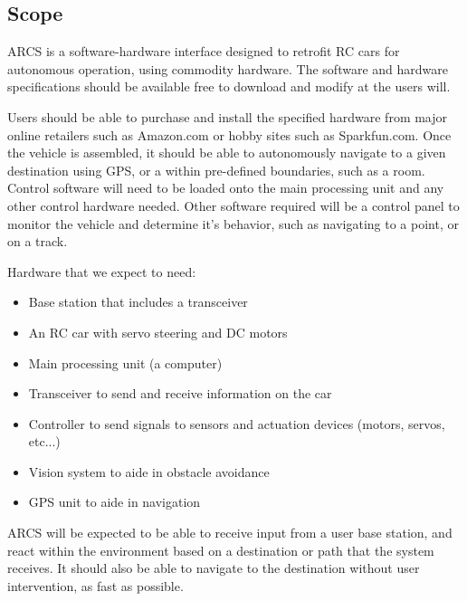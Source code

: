 \documentclass[compsoc,draftclsnofoot,onecolumn,10pt]{IEEEtran}
\begin{document}
\subsection{Scope} %
ARCS is a software-hardware interface designed to retrofit RC cars for autonomous operation, using commodity hardware. 
The software and hardware specifications should be available free to download and modify at the users will. \par
Users should be able to purchase and install the specified hardware from major online retailers such as Amazon.com or hobby sites such as Sparkfun.com.
Once the vehicle is assembled, it should be able to autonomously navigate to a given destination using GPS, or a within pre-defined boundaries, such as a room.  
Control software will need to be loaded onto the main processing unit and any other control hardware needed. 
Other software required will be a control panel to monitor the vehicle and determine it's behavior, such as navigating to a point, or on a track. 

Hardware that we expect to need:
\begin{itemize} 
\item Base station that includes a transceiver
\item An RC car with servo steering and DC motors
\item Main processing unit (a computer)
\item Transceiver to send and receive information on the car
\item Controller to send signals to sensors and actuation devices (motors, servos, etc...) 
\item Vision system to aide in obstacle avoidance
\item GPS unit to aide in navigation
\end{itemize}

ARCS will be expected to be able to receive input from a user base station, and react
within the environment based on a destination or path that the system receives. It should also
be able to navigate to the destination without user intervention, as fast as possible. \par
\end{document}
